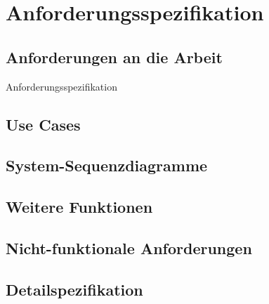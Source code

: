 \chapter{Anforderungsspezifikation}
\label{pd-anforderungsspezifikation}

\section{Anforderungen an die Arbeit}
\begin{flushleft}
Anforderungsspezifikation
\end{flushleft}

\section{Use Cases}


\section{System-Sequenzdiagramme}


\section{Weitere Funktionen}


\section{Nicht-funktionale Anforderungen}


\section{Detailspezifikation}

